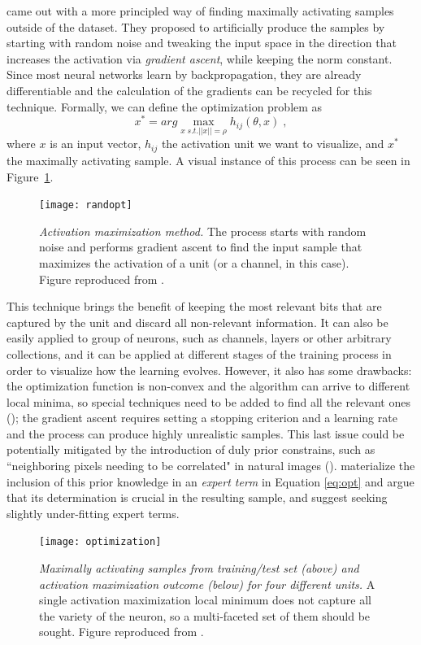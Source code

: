 		\cite{Erhan2009} came out with a more principled way of finding maximally activating samples outside of the dataset. They proposed to artificially produce the samples by starting with random noise and tweaking the input space in the direction that increases the activation via \textit{gradient ascent}, while keeping the norm constant. Since most neural networks learn by backpropagation, they are already differentiable and the calculation of the gradients can be recycled for this technique. Formally, we can define the optimization problem as
		\begin{equation}
		x^* = arg \max\limits_{x \; s.t. ||x||=\rho} h_{ij}(\theta,x) \; ,
		\label{eq:opt}
		\end{equation}
		where $x$ is an input vector, $h_{ij}$ the activation unit we want to visualize, and $x^*$ the maximally activating sample. A visual instance of this process can be seen in Figure~\ref{fig:randopt}.
		
		\begin{figure}
			\centering
			\texttt{[image: randopt]}
			\caption{\textit{Activation maximization method.} The process starts with random noise and performs gradient ascent to find the input sample that maximizes the activation of a unit (or a channel, in this case). Figure reproduced from \cite{Olah2017}.}
			\label{fig:randopt}
		\end{figure}
		
		This technique brings the benefit of keeping the most relevant bits that are captured by the unit and discard all non-relevant information. It can also be easily applied to group of neurons, such as channels, layers or other arbitrary collections, and it can be applied at different stages of the training process in order to visualize how the learning evolves. However, it also has some drawbacks: the optimization function is non-convex and the algorithm can arrive to different local minima, so special techniques need to be added to find all the relevant ones (\cite{Nguyen2016,Olah2017}); the gradient ascent requires setting a stopping criterion and a learning rate and the process can produce highly unrealistic samples. This last issue could be potentially mitigated by the introduction of duly prior constrains, such as ``neighboring pixels needing to be correlated" in natural images (\cite{Mordvintsev2015}). \cite{Montavon2018} materialize the inclusion of this prior knowledge in an \textit{expert term} in Equation \ref{eq:opt} and argue that its determination is crucial in the resulting sample, and suggest seeking slightly under-fitting expert terms.	
		\begin{figure}
			\centering
			\texttt{[image: optimization]}
			\caption{\textit{Maximally activating samples from training/test set (above) and activation maximization outcome (below) for four different units.} A single activation maximization local minimum does not capture all the variety of the neuron, so a multi-faceted set of them should be sought. Figure reproduced from \cite{Olah2017}.}
			\label{optimization}
		\end{figure}
	
